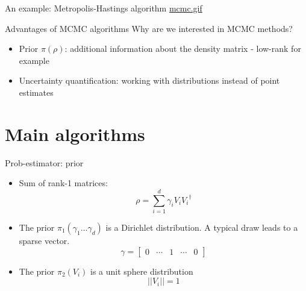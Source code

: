 \documentclass{beamer}
\begin{document}

\begin{frame}{An example: Metropolis-Hastings algorithm}
    \href{run:./mcmc.gif}{mcmc.gif}

\end{frame}

\begin{frame}{Advantages of MCMC algorithms}
    Why are we interested in MCMC methods?
    \begin{itemize}
        \item Prior $\pi(\rho)$: additional information about the density matrix - low-rank for example
        \item Uncertainty quantification: working with distributions instead of point estimates
    \end{itemize} 
\end{frame}
\section{Main algorithms}
\begin{frame}{Prob-estimator: prior}
    \begin{itemize}
        \item Sum of rank-1 matrices: \[\rho = \sum_{i=1}^{d} \gamma_i V_i {V_i}^\dagger\]
        \item The prior $\pi_1(\gamma_1 \dots \gamma_d)$ is a Dirichlet distribution. A typical draw leads to a sparse vector.
        \begin{equation*}
            \gamma = \begin{bmatrix}
                0 & \cdots & 1 & \cdots & 0
            \end{bmatrix}
        \end{equation*}
        \item The prior $\pi_2(V_i)$ is a unit sphere distribution
        \begin{equation*}
            ||V_i|| = 1
        \end{equation*}
    \end{itemize}
\end{frame}
\end{document}

